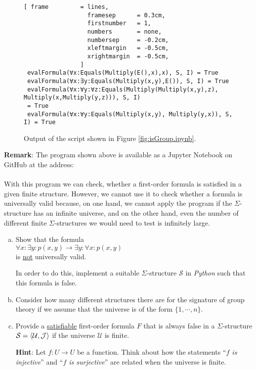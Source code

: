 \begin{figure}[!ht]
\centering
\begin{Verbatim}[ frame         = lines, 
                  framesep      = 0.3cm, 
                  firstnumber   = 1,
                  numbers       = none,
                  numbersep     = -0.2cm,
                  xleftmargin   = -0.5cm,
                  xrightmargin  = -0.5cm,
                ]
 evalFormula(∀x:Equals(Multiply(E(),x),x), S, I) = True
 evalFormula(∀x:∃y:Equals(Multiply(x,y),E()), S, I) = True
 evalFormula(∀x:∀y:∀z:Equals(Multiply(Multiply(x,y),z), Multiply(x,Multiply(y,z))), S, I)
 = True
 evalFormula(∀x:∀y:Equals(Multiply(x,y), Multiply(y,x)), S, I) = True
\end{Verbatim}
\vspace*{-0.3cm}
\caption{Output of the script shown in Figure \ref{fig:isGroup.ipynb}.}
\label{fig:isGroup.out}
\end{figure}
\noindent
\textbf{Remark}: The program shown above is available as a Jupyter Notebook on GitHub at the address:
\\[0.2cm]
\hspace*{0.0cm}
\href{https://github.com/karlstroetmann/Logic/blob/master/Python/Chapter-5/01-FOL-Evaluation.ipynb}{}
\\[0.2cm]
With this program we can check, whether a
first-order formula is satisfied in a given finite structure. However, we cannot use it to check whether a
formula is universally valid because, on one hand, we cannot apply the program if the $\Sigma$-structure has an
infinite universe, and on the other hand, even the number of different finite $\Sigma$-structures we would need
to test is infinitely large. \eox 

\exerciseEng
\begin{enumerate}[(a)]
\item Show that the formula
      \\[0.2cm]
      \hspace*{1.3cm}
      $\forall x: \exists y: p(x,y) \rightarrow \exists y: \forall x: p(x,y)$
      \\[0.2cm]
      is \underline{not} universally valid.

      In order to do this, implement a suitable $\Sigma$-structure $\mathcal{S}$ in \textsl{Python}
      such that this formula is false. 

\item Consider how many different structures there are for the signature of group theory if we assume that the
      universe is of the form $\{1, \cdots, n\}$.

\item Provide a \underline{satisfiable} first-order formula $F$ that is always false in a 
      $\Sigma$-structure $\mathcal{S} = \pair(\mathcal{U},\mathcal{J})$ if  the universe $\mathcal{U}$ is finite.

      \textbf{Hint}: Let $f: U \rightarrow U$ be a function. Think about how the statements
      ``\emph{$f$ is injective}'' and ``\emph{$f$ is surjective}'' are related when the universe is finite.
      \exend  
\end{enumerate}

